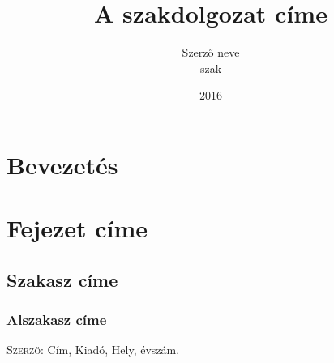 \documentclass[centeredchapter]{thesis-ekf}
\institute{Matematikai és Informatikai Intézet}
\title{A szakdolgozat címe}
\author{Szerző neve\\ szak}
\date{2016}
\theoremstyle{definition}
\theoremstyle{remark}
\begin{document}
\maketitle
\tableofcontents

\chapter*{Bevezetés}

\chapter{Fejezet címe}

\section{Szakasz címe}

\subsection{Alszakasz címe}

\begin{thebibliography}{1}
 \textsc{Szerző}: Cím, Kiadó, Hely, évszám.
\end{thebibliography}
\end{document}
